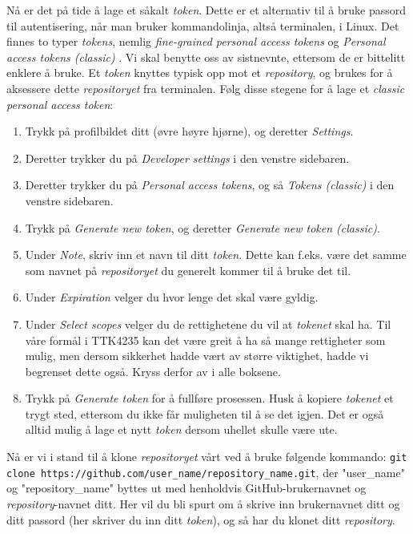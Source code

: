 Nå er det på tide å lage et såkalt \textit{token}. Dette er et alternativ til å bruke passord til autentisering, når man bruker kommandolinja, altså terminalen, i Linux. Det finnes to typer \textit{tokens}, nemlig \textit{fine-grained personal access tokens} og \textit{Personal access tokens (classic)
}. Vi skal benytte oss av sistnevnte, ettersom de er bittelitt enklere å bruke. Et \textit{token} knyttes typisk opp mot et \textit{repository}, og brukes for å aksessere dette \textit{repositoryet} fra terminalen. Følg disse stegene for å lage et \textit{classic personal access token}:

\begin{enumerate}
    \item Trykk på profilbildet ditt (øvre høyre hjørne), og deretter \textit{Settings}.
    \item Deretter trykker du på \textit{Developer settings} i den venstre sidebaren.
    \item Deretter trykker du på \textit{Personal access tokens}, og så \textit{Tokens (classic)} i den venstre sidebaren.
    \item Trykk på \textit{Generate new token}, og deretter \textit{Generate new token (classic)}.
    \item Under \textit{Note}, skriv inn et navn til ditt \textit{token}. Dette kan f.eks. være det samme som navnet på \textit{repositoryet} du generelt kommer til å bruke det til.
    \item Under \textit{Expiration} velger du hvor lenge det skal være gyldig.
    \item Under \textit{Select scopes} velger du de rettighetene du vil at \textit{tokenet} skal ha. Til våre formål i TTK4235 kan det være greit å ha så mange rettigheter som mulig, men dersom sikkerhet hadde vært av større viktighet, hadde vi begrenset dette også. Kryss derfor av i alle boksene.
    \item Trykk på \textit{Generate token} for å fullføre prosessen. Husk å kopiere \textit{tokenet} et trygt sted, ettersom du ikke får muligheten til å se det igjen. Det er også alltid mulig å lage et nytt \textit{token} dersom uhellet skulle være ute.
\end{enumerate}

Nå er vi i stand til å klone \textit{repositoryet} vårt ved å bruke følgende kommando: \verb|git clone https://github.com/user_name/repository_name.git|, der "user\_name" og "repository\_name" byttes ut med henholdvis GitHub-brukernavnet og \textit{repository}-navnet ditt. Her vil du bli spurt om å skrive inn brukernavnet ditt og ditt passord (her skriver du inn ditt \textit{token}), og så har du klonet ditt \textit{repository}. 

